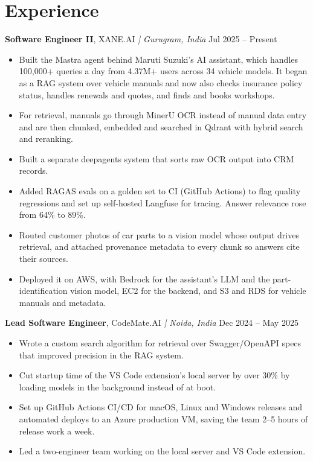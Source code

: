 \documentclass[10pt,a4paper]{article}
\newcommand{\role}[4]{%
  \textbf{#1}, #2 {\small\itshape | #3} \hfill #4\par\vspace{1pt}}
\begin{document}
\section{Experience}
\role{Software Engineer II}{XANE.AI}{Gurugram, India}{Jul 2025 -- Present}
\begin{itemize}
  \item Built the Mastra agent behind Maruti Suzuki's AI assistant, which handles 100,000+ queries a day from 4.37M+ users across 34 vehicle models. It began as a RAG system over vehicle manuals and now also checks insurance policy status, handles renewals and quotes, and finds and books workshops.
  \item For retrieval, manuals go through MinerU OCR instead of manual data entry and are then chunked, embedded and searched in Qdrant with hybrid search and reranking.
  \item Built a separate deepagents system that sorts raw OCR output into CRM records.
  \item Added RAGAS evals on a golden set to CI (GitHub Actions) to flag quality regressions and set up self-hosted Langfuse for tracing. Answer relevance rose from 64\% to 89\%.
  \item Routed customer photos of car parts to a vision model whose output drives retrieval, and attached provenance metadata to every chunk so answers cite their sources.
  \item Deployed it on AWS, with Bedrock for the assistant's LLM and the part-identification vision model, EC2 for the backend, and S3 and RDS for vehicle manuals and metadata.
\end{itemize}

\role{Lead Software Engineer}{CodeMate.AI}{Noida, India}{Dec 2024 -- May 2025}
\begin{itemize}
  \item Wrote a custom search algorithm for retrieval over Swagger/OpenAPI specs that improved precision in the RAG system.
  \item Cut startup time of the VS Code extension's local server by over 30\% by loading models in the background instead of at boot.
  \item Set up GitHub Actions CI/CD for macOS, Linux and Windows releases and automated deploys to an Azure production VM, saving the team 2--5 hours of release work a week.
  \item Led a two-engineer team working on the local server and VS Code extension.
\end{itemize}
\end{document}
